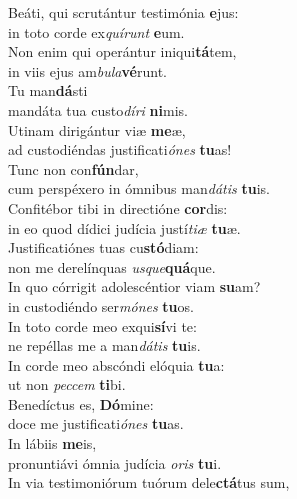 \evenverse Beáti, qui scrutántur testimónia \textbf{e}jus:~\*\\
\evenverse in toto corde ex\textit{quí}\textit{runt} \textbf{e}um.\\
\oddverse Non enim qui operántur iniqui\textbf{tá}tem,~\*\\
\oddverse in viis ejus am\textit{bu}\textit{la}\textbf{vé}runt.\\
\evenverse Tu man\textbf{dá}sti~\*\\
\evenverse mandáta tua custo\textit{dí}\textit{ri} \textbf{ni}mis.\\
\oddverse Utinam dirigántur viæ \textbf{me}æ,~\*\\
\oddverse ad custodiéndas justificati\textit{ó}\textit{nes} \textbf{tu}as!\\
\evenverse Tunc non con\textbf{fún}dar,~\*\\
\evenverse cum perspéxero in ómnibus man\textit{dá}\textit{tis} \textbf{tu}is.\\
\oddverse Confitébor tibi in directióne \textbf{cor}dis:~\*\\
\oddverse in eo quod dídici judícia justí\textit{ti}\textit{æ} \textbf{tu}æ.\\
\evenverse Justificatiónes tuas cu\textbf{stó}diam:~\*\\
\evenverse non me derelínquas \textit{us}\textit{que}\textbf{quá}que.\\
\oddverse In quo córrigit adolescéntior viam \textbf{su}am?~\*\\
\oddverse in custodiéndo ser\textit{mó}\textit{nes} \textbf{tu}os.\\
\evenverse In toto corde meo exqui\textbf{sí}vi te:~\*\\
\evenverse ne repéllas me a man\textit{dá}\textit{tis} \textbf{tu}is.\\
\oddverse In corde meo abscóndi elóquia \textbf{tu}a:~\*\\
\oddverse ut non \textit{pec}\textit{cem} \textbf{ti}bi.\\
\evenverse Benedíctus es, \textbf{Dó}mine:~\*\\
\evenverse doce me justificati\textit{ó}\textit{nes} \textbf{tu}as.\\
\oddverse In lábiis \textbf{me}is,~\*\\
\oddverse pronuntiávi ómnia judícia \textit{o}\textit{ris} \textbf{tu}i.\\
\evenverse In via testimoniórum tuórum dele\textbf{ctá}tus sum,~\*\\
